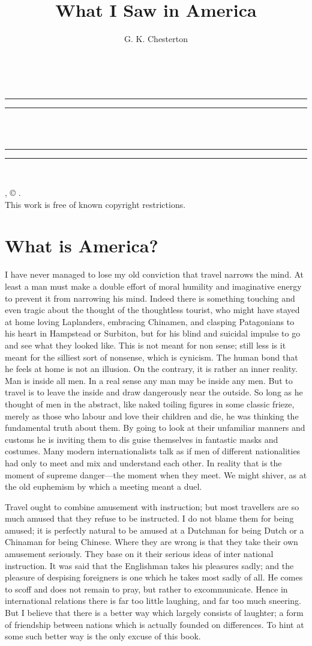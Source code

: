 \documentclass{book}
\date{}
\title{What I Saw in America}
\author{G. K. Chesterton}
\makeatletter
\renewcommand{\maketitle}{
  \thispagestyle{empty}
  \vspace*{\stretch{1}}
  
  \begin{center}
    {\Huge \@title   \\[5mm]}
  \end{center}
  \vspace*{\stretch{2}}
  
  \newpage
  \thispagestyle{empty}
  \cleardoublepage

  \begin{center}  
    \thispagestyle{empty}
    \vspace*{\baselineskip}
    \rule{\textwidth}{1.6pt}\vspace*{-\baselineskip}\vspace*{2pt}
    \rule{\textwidth}{0.4pt}\\[\baselineskip]
    
    {\Huge\scshape \@title   \\[5mm]}
    {\Large }
    
    \rule{\textwidth}{0.4pt}\vspace*{-\baselineskip}\vspace{3.2pt}
    \rule{\textwidth}{1.6pt}\\[\baselineskip]

    \vspace*{4\baselineskip}

    {\Large \@author}
    \vfill
    
  \end{center}
  
  \pagebreak
  \newpage
  \thispagestyle{empty}
  \null\vfill
  \noindent
  \begin{center}
    {\emph{\@title}, © \@author.\\[5mm]}
    {This work is free of known copyright restrictions.\\[5mm]}
  \end{center}
  \pagebreak
  \newpage
}
\makeatother
\begin{document}



\maketitle

\setcounter{tocdepth}{0}
\setcounter{secnumdepth}{0}
\chapter{What is America?}
\label{chapter-0}
I have never managed to lose my old conviction that travel narrows the mind. At least a man must make a double effort of moral humility and imaginative energy to prevent it from narrowing his mind. Indeed there is something touching and even tragic about the thought of the thoughtless tourist, who might have stayed at home loving Laplanders, embracing Chinamen, and clasping Patagonians to his heart in Hampstead or Surbiton, but for his blind and suicidal impulse to go and see what they looked like. This is not meant for non sense; still less is it meant for the silliest sort of nonsense, which is cynicism. The human bond that he feels at home is not an illusion. On the contrary, it is rather an inner reality. Man is inside all men. In a real sense any man may be inside any men. But to travel is to leave the inside and draw dangerously near the outside. So long as he thought of men in the abstract, like naked toiling figures in some classic frieze, merely as those who labour and love their children and die, he was thinking the fundamental truth about them. By going to look at their unfamiliar manners and customs he is inviting them to dis guise themselves in fantastic masks and costumes. Many modern internationalists talk as if men of different nationalities had only to meet and mix and understand each other. In reality that is the moment of supreme danger—the moment when they meet. We might shiver, as at the old euphemism by which a meeting meant a duel.

Travel ought to combine amusement with instruction; but most travellers are so much amused that they refuse to be instructed. I do not blame them for being amused; it is perfectly natural to be amused at a Dutchman for being Dutch or a Chinaman for being Chinese. Where they are wrong is that they take their own amusement seriously. They base on it their serious ideas of inter national instruction. It was said that the Englishman takes his pleasures sadly; and the pleasure of despising foreigners is one which he takes most sadly of all. He comes to scoff and does not remain to pray, but rather to excommunicate. Hence in international relations there is far too little laughing, and far too much sneering. But I believe that there is a better way which largely consists of laughter; a form of friendship between nations which is actually founded on differences. To hint at some such better way is the only excuse of this book.
\end{document}
